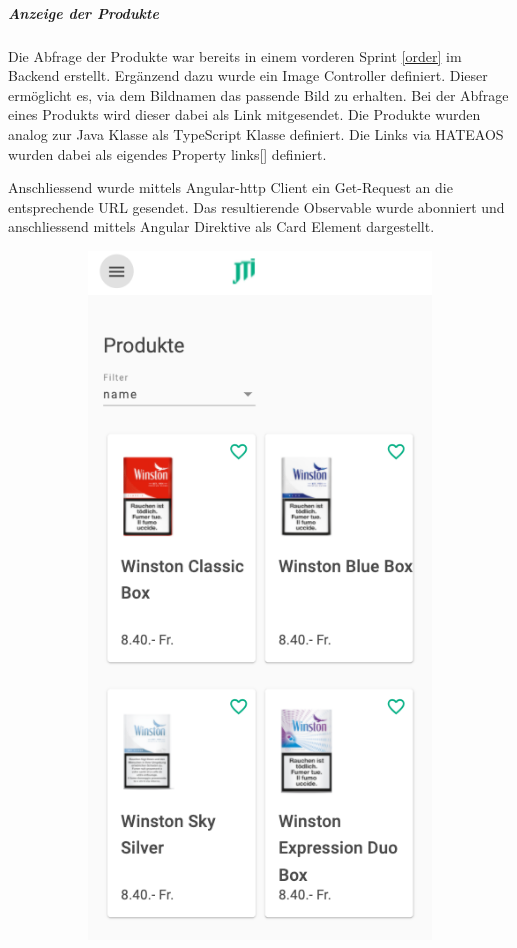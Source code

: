 \subparagraph{Anzeige der Produkte}
Die Abfrage der Produkte war bereits in einem vorderen Sprint \ref{order} im Backend erstellt. Ergänzend dazu wurde ein Image Controller definiert. Dieser ermöglicht es, via dem Bildnamen das passende Bild zu erhalten. Bei der Abfrage eines Produkts wird dieser dabei als Link mitgesendet. Die Produkte wurden analog zur Java Klasse als TypeScript Klasse definiert. Die Links via HATEAOS wurden dabei als eigendes Property links[] definiert. 

Anschliessend wurde mittels Angular-http Client ein Get-Request an die entsprechende URL gesendet. Das resultierende Observable wurde abonniert und anschliessend mittels Angular Direktive als Card Element dargestellt. 

\begin{figure}[H]
	\begin{subfigure}[b]{0.5\textwidth}
		\includegraphics[scale=0.5]{images/productsPhone.PNG}

\end{subfigure}
\end{figure}
